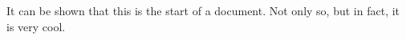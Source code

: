 

	\begin{centering}
		It can be shown that this is the start of a document. Not only so, but in fact, it is very cool.
	\end{centering}


